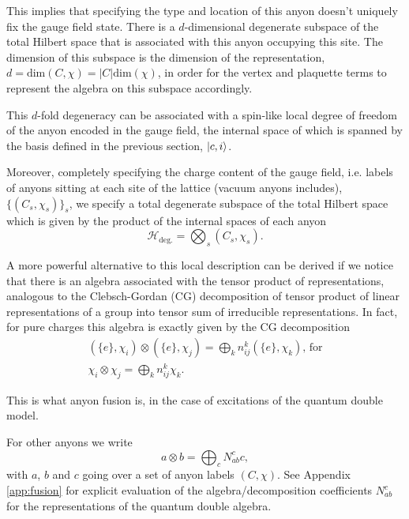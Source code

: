 \documentclass[two column]{article}
\begin{document}
This implies that specifying the type and location of this anyon doesn't uniquely fix the gauge field state. There is a $d$-dimensional degenerate subspace of the total Hilbert space that is associated with this anyon occupying this site. The dimension of this subspace is the dimension of the representation, $d = \text{dim}(C, \chi) = |C|\text{dim}(\chi)$, in order for the vertex and plaquette terms to represent the algebra on this subspace accordingly.

This $d$-fold degeneracy can be associated with a spin-like local degree of freedom of the anyon encoded in the gauge field, the internal space of which is spanned by the basis defined in the previous section, $\ket{c, i}$.

Moreover, completely specifying the charge content of the gauge field, i.e. labels of anyons sitting at each site of the lattice (vacuum anyons includes), $\{(C_s, \chi_s)\}_s$, we specify a total degenerate subspace of the total Hilbert space which is given by the product of the internal spaces of each anyon
\begin{equation}
	\mathcal{H}_{\text{deg.}} = \bigotimes_s (C_s, \chi_s).
\end{equation}

A more powerful alternative to this local description can be derived if we notice that
there is an algebra associated with the tensor product of representations, analogous to the Clebsch-Gordan (CG) decomposition of tensor product of linear representations of a group into tensor sum of irreducible representations. In fact, for pure charges this algebra is exactly given by the CG decomposition
\begin{equation}
\begin{split}
	(\{e\}, \chi_i)\otimes (\{e\}, \chi_j) = \bigoplus_k n^k_{ij} (\{e\}, \chi_k) \text{, for}\\
	\chi_i\otimes\chi_j = \bigoplus_k n^k_{ij} \chi_k.
\end{split}
\end{equation}

This is what anyon fusion is, in the case of excitations of the quantum double model. 

For other anyons we write
\begin{equation}
	a \otimes b = \bigoplus_{c}N^c_{ab} c,\label{eqn:fuse} 
\end{equation}
with $a$, $b$ and $c$ going over a set of anyon labels $(C, \chi)$. See Appendix \ref{app:fusion} for explicit evaluation of the algebra/decomposition coefficients $N_{ab}^c$ for the representations of the quantum double algebra.
\end{document}
